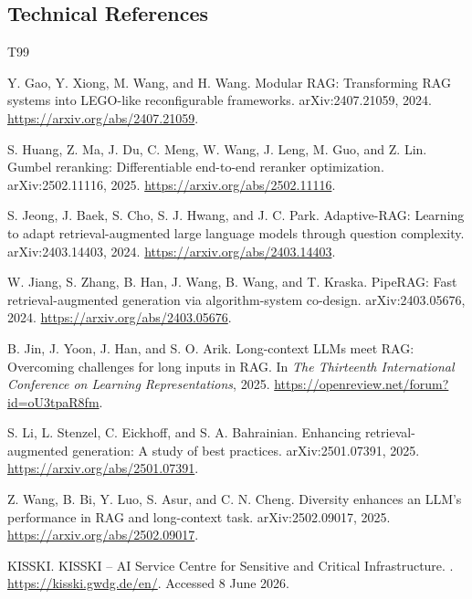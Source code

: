 \subsection*{Technical References}
\renewcommand{\refname}{}
\vspace{-1.2\baselineskip}
\begin{thebibliography}{T99}

Y. Gao, Y. Xiong, M. Wang, and H. Wang.
\newblock Modular RAG: Transforming RAG systems into LEGO-like reconfigurable frameworks.
\newblock arXiv:2407.21059, 2024.
\newblock \url{https://arxiv.org/abs/2407.21059}.

S. Huang, Z. Ma, J. Du, C. Meng, W. Wang, J. Leng, M. Guo, and Z. Lin.
\newblock Gumbel reranking: Differentiable end-to-end reranker optimization.
\newblock arXiv:2502.11116, 2025.
\newblock \url{https://arxiv.org/abs/2502.11116}.

S. Jeong, J. Baek, S. Cho, S. J. Hwang, and J. C. Park.
\newblock Adaptive-RAG: Learning to adapt retrieval-augmented large language models through question complexity.
\newblock arXiv:2403.14403, 2024.
\newblock \url{https://arxiv.org/abs/2403.14403}.

W. Jiang, S. Zhang, B. Han, J. Wang, B. Wang, and T. Kraska.
\newblock PipeRAG: Fast retrieval-augmented generation via algorithm-system co-design.
\newblock arXiv:2403.05676, 2024.
\newblock \url{https://arxiv.org/abs/2403.05676}.

B. Jin, J. Yoon, J. Han, and S. O. Arik.
\newblock Long-context LLMs meet RAG: Overcoming challenges for long inputs in RAG.
\newblock In \emph{The Thirteenth International Conference on Learning Representations}, 2025.
\newblock \url{https://openreview.net/forum?id=oU3tpaR8fm}.

S. Li, L. Stenzel, C. Eickhoff, and S. A. Bahrainian.
\newblock Enhancing retrieval-augmented generation: A study of best practices.
\newblock arXiv:2501.07391, 2025.
\newblock \url{https://arxiv.org/abs/2501.07391}.

Z. Wang, B. Bi, Y. Luo, S. Asur, and C. N. Cheng.
\newblock Diversity enhances an LLM's performance in RAG and long-context task.
\newblock arXiv:2502.09017, 2025.
\newblock \url{https://arxiv.org/abs/2502.09017}.

KISSKI.
\newblock KISSKI -- AI Service Centre for Sensitive and Critical Infrastructure.
.
\newblock \url{https://kisski.gwdg.de/en/}. Accessed 8 June 2026.

\end{thebibliography}

